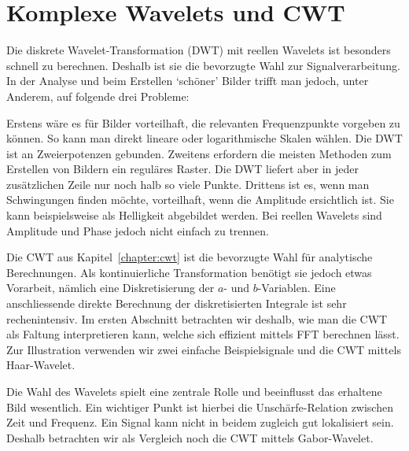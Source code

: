 %
%
%

\chapter{Komplexe Wavelets und CWT\label{chapter:complex}}
\begin{refsection}

Die diskrete Wavelet-Transformation (DWT) mit reellen Wavelets ist besonders schnell zu berechnen.
Deshalb ist sie die bevorzugte Wahl zur Signalverarbeitung.
In der Analyse und beim Erstellen `schöner' Bilder trifft man jedoch, unter Anderem, auf folgende drei Probleme:

Erstens wäre es für Bilder vorteilhaft, die relevanten Frequenzpunkte vorgeben zu können.
So kann man direkt lineare oder logarithmische Skalen wählen. Die DWT ist an Zweierpotenzen gebunden. %
Zweitens erfordern die meisten Methoden zum Erstellen von Bildern ein reguläres Raster.
Die DWT liefert aber in jeder zusätzlichen Zeile nur noch halb so viele Punkte.
Drittens ist es, wenn man Schwingungen finden möchte, vorteilhaft, wenn die Amplitude ersichtlich ist.
Sie kann beispielsweise als Helligkeit abgebildet werden. 
Bei reellen Wavelets sind Amplitude und Phase jedoch nicht einfach zu trennen.

Die CWT aus Kapitel~\ref{chapter:cwt} ist die bevorzugte Wahl für analytische Berechnungen.
Als kontinuierliche Transformation benötigt sie jedoch etwas Vorarbeit,
nämlich eine Diskretisierung der $a$- und $b$-Variablen.
Eine anschliessende direkte Berechnung der diskretisierten Integrale ist sehr rechenintensiv.
Im ersten Abschnitt betrachten wir deshalb, wie man die CWT als Faltung interpretieren kann, welche sich effizient mittels FFT berechnen lässt.
Zur Illustration verwenden wir zwei einfache Beispielsignale und die CWT mittels Haar-Wavelet.

Die Wahl des Wavelets spielt eine zentrale Rolle und beeinflusst das erhaltene Bild wesentlich.
Ein wichtiger Punkt ist hierbei die Unschärfe-Relation zwischen Zeit und Frequenz.
Ein Signal kann nicht in beidem zugleich gut lokalisiert sein.
Deshalb betrachten wir als Vergleich noch die CWT mittels Gabor-Wavelet.


\end{refsection}
